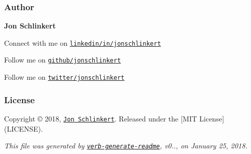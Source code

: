 \subsubsection*{Author}

{\bfseries Jon Schlinkert}


\begin{DoxyItemize}
\item Connect with me on \href{https://linkedin.com/in/jonschlinkert}{\tt linkedin/in/jonschlinkert}
\item Follow me on \href{https://github.com/jonschlinkert}{\tt github/jonschlinkert}
\item Follow me on \href{https://twitter.com/jonschlinkert}{\tt twitter/jonschlinkert}
\end{DoxyItemize}

\subsubsection*{License}

Copyright © 2018, \href{https://github.com/jonschlinkert}{\tt Jon Schlinkert}. Released under the \mbox{[}M\+IT License\mbox{]}(L\+I\+C\+E\+N\+SE).





{\itshape This file was generated by \href{https://github.com/verbose/verb-generate-readme}{\tt verb-\/generate-\/readme}, v0.., on January 25, 2018.} 